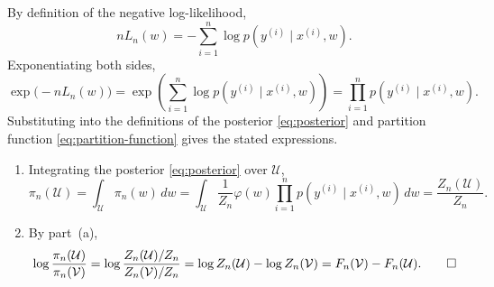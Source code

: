 \documentclass[11pt]{article}
\newcommand{\U}{\mathcal{U}}
\newcommand{\V}{\mathcal{V}}
\begin{document}
\begin{solution}[ex:gibbs]
    By definition of the negative log-likelihood,
    \begin{equation*}
        n L_n(w)
        = -\sum_{i=1}^{n} \log p(y^{(i)} \mid x^{(i)}, w).
    \end{equation*}
    Exponentiating both sides,
    \begin{equation*}
        \exp\!\big({-}n L_n(w)\big)
        = \exp\!\left(\sum_{i=1}^{n} \log p(y^{(i)} \mid x^{(i)}, w)\right)
        = \prod_{i=1}^{n} p(y^{(i)} \mid x^{(i)}, w).
    \end{equation*}
    Substituting into the definitions of the posterior
    \eqref{eq:posterior} and partition function \eqref{eq:partition-function}
    gives the stated expressions.
\end{solution}

\begin{solution}
\begin{enumerate}
    \item
        Integrating the posterior \eqref{eq:posterior} over $\U$,
        \begin{equation*}
            \pi_n(\U)
            = \int_{\U} \pi_n(w) \, dw
            = \int_{\U} \frac{1}{Z_n} \varphi(w)
                \prod_{i=1}^{n} p(y^{(i)} \mid x^{(i)}, w) \, dw
            = \frac{Z_n(\U)}{Z_n}.
        \end{equation*}

    \item
        By part~(a),
        \begin{equation*}
            \log \frac{\pi_n(\U)}{\pi_n(\V)}
            = \log \frac{Z_n(\U) / Z_n}{Z_n(\V) / Z_n}
            = \log Z_n(\U) - \log Z_n(\V)
            = F_n(\V) - F_n(\U). \qedhere
        \end{equation*}
\end{enumerate}
\end{solution}
\end{document}
